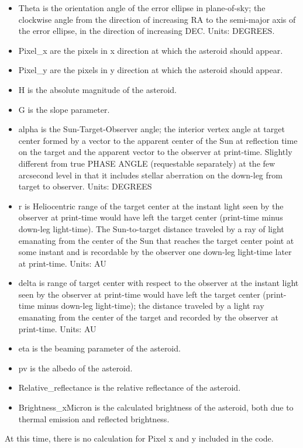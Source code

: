 \begin{itemize}
    \item Theta is the orientation angle of the error ellipse in plane-of-sky; the clockwise angle from the direction of increasing RA to the semi-major axis of the error ellipse, in the direction of increasing DEC.  Units: DEGREES.
    \item Pixel\_x are the pixels in x direction at which the asteroid should appear. 
    \item Pixel\_y are the pixels in y direction at which the asteroid should appear. 
    \item H is the absolute magnitude of the asteroid.
    \item G is the slope parameter.
    \item alpha is the Sun-Target-Observer angle; the interior vertex angle at
target center formed by a vector to the apparent center of the Sun at
reflection time on the target and the apparent vector to the observer at
print-time. Slightly different from true PHASE ANGLE (requestable separately)
at the few arcsecond level in that it includes stellar aberration on the
down-leg from target to observer.  Units: DEGREES
    \item r is Heliocentric range
of the target center at the instant light seen by the observer at print-time
would have left the target center (print-time minus down-leg light-time).
The Sun-to-target distance traveled by a ray of light emanating from the
center of the Sun that reaches the target center point at some instant and
is recordable by the observer one down-leg light-time later at print-time.
Units: AU 
    \item delta is range of target center with respect
to the observer at the instant light seen by the observer at print-time would
have left the target center (print-time minus down-leg light-time); the
distance traveled by a light ray emanating from the center of the target and
recorded by the observer at print-time. 
Units: AU 
    \item eta is the beaming parameter of the asteroid.
    \item pv is the albedo of the asteroid. 
    \item Relative\_reflectance is the relative reflectance of the asteroid.
    \item Brightness\_xMicron is the calculated brightness of the asteroid, both due to thermal emission and reflected brightness. 
    
\end{itemize}
At this time, there is no calculation for Pixel x and y included in the code.\\


